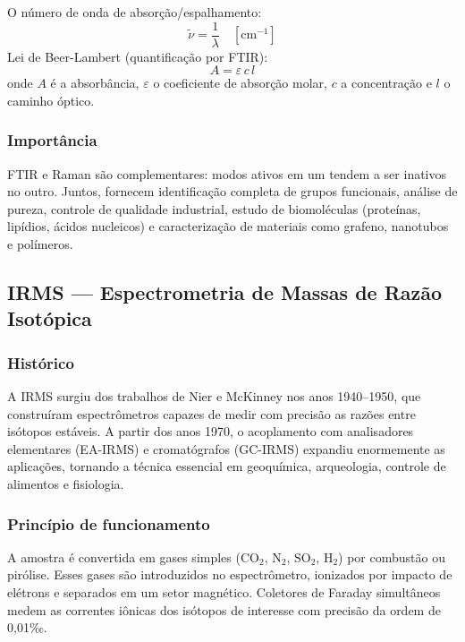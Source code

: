 O número de onda de absorção/espalhamento:
\begin{equation}
    \tilde{\nu} = \frac{1}{\lambda} \quad [\text{cm}^{-1}]
\end{equation}
Lei de Beer-Lambert (quantificação por FTIR):
\begin{equation}
    A = \varepsilon\,c\,l
\end{equation}
onde $A$ é a absorbância, $\varepsilon$ o coeficiente de absorção molar,
$c$ a concentração e $l$ o caminho óptico.

\subsubsection*{Importância}

FTIR e Raman são complementares: modos ativos em um tendem a ser inativos
no outro. Juntos, fornecem identificação completa de grupos funcionais,
análise de pureza, controle de qualidade industrial, estudo de
biomoléculas (proteínas, lipídios, ácidos nucleicos) e caracterização de
materiais como grafeno, nanotubos e polímeros.

\subsection{IRMS --- Espectrometria de Massas de Razão Isotópica}

\subsubsection*{Histórico}

A IRMS surgiu dos trabalhos de Nier e McKinney nos anos 1940--1950, que
construíram espectrômetros capazes de medir com precisão as razões entre
isótopos estáveis. A partir dos anos 1970, o acoplamento com analisadores
elementares (EA-IRMS) e cromatógrafos (GC-IRMS) expandiu enormemente as
aplicações, tornando a técnica essencial em geoquímica, arqueologia,
controle de alimentos e fisiologia.

\subsubsection*{Princípio de funcionamento}

A amostra é convertida em gases simples ($\text{CO}_2$, $\text{N}_2$,
$\text{SO}_2$, $\text{H}_2$) por combustão ou pirólise. Esses gases são
introduzidos no espectrômetro, ionizados por impacto de elétrons e
separados em um setor magnético. Coletores de Faraday simultâneos medem
as correntes iônicas dos isótopos de interesse com precisão da ordem de
0,01‰.

